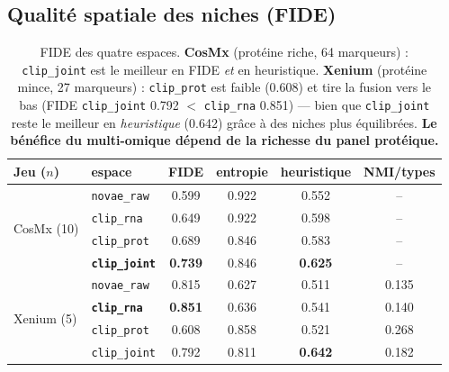 \documentclass[11pt,a4paper]{article}
\newcommand{\best}[1]{\textbf{#1}}
\begin{document}
\subsection{Qualité spatiale des niches (FIDE)}
\begin{table}[h]
\centering\small
\begin{tabular}{llcccc}
\toprule
Jeu ($n$) & espace & FIDE & entropie & heuristique & NMI/types \\
\midrule
\multirow{4}{*}{CosMx (10)}
 & \texttt{novae\_raw}  & 0.599 & 0.922 & 0.552 & -- \\
 & \texttt{clip\_rna}   & 0.649 & 0.922 & 0.598 & -- \\
 & \texttt{clip\_prot}  & 0.689 & 0.846 & 0.583 & -- \\
 & \best{\texttt{clip\_joint}} & \best{0.739} & 0.846 & \best{0.625} & -- \\
\midrule
\multirow{4}{*}{Xenium (5)}
 & \texttt{novae\_raw}  & 0.815 & 0.627 & 0.511 & 0.135 \\
 & \best{\texttt{clip\_rna}} & \best{0.851} & 0.636 & 0.541 & 0.140 \\
 & \texttt{clip\_prot}  & 0.608 & 0.858 & 0.521 & 0.268 \\
 & \texttt{clip\_joint} & 0.792 & 0.811 & \best{0.642} & 0.182 \\
\bottomrule
\end{tabular}
\caption{FIDE des quatre espaces. \textbf{CosMx} (protéine riche, 64 marqueurs) :
\texttt{clip\_joint} est le meilleur en FIDE \emph{et} en heuristique. \textbf{Xenium}
(protéine mince, 27 marqueurs) : \texttt{clip\_prot} est faible (0.608) et tire la fusion
vers le bas (FIDE \texttt{clip\_joint} 0.792 $<$ \texttt{clip\_rna} 0.851) --- bien que
\texttt{clip\_joint} reste le meilleur en \emph{heuristique} (0.642) grâce à des niches plus
équilibrées. \textbf{Le bénéfice du multi-omique dépend de la richesse du panel protéique.}}
\end{table}
\end{document}
